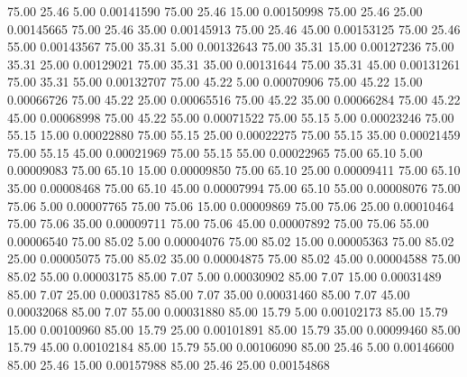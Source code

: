      75.00     25.46      5.00     0.00141590
     75.00     25.46     15.00     0.00150998
     75.00     25.46     25.00     0.00145665
     75.00     25.46     35.00     0.00145913
     75.00     25.46     45.00     0.00153125
     75.00     25.46     55.00     0.00143567
     75.00     35.31      5.00     0.00132643
     75.00     35.31     15.00     0.00127236
     75.00     35.31     25.00     0.00129021
     75.00     35.31     35.00     0.00131644
     75.00     35.31     45.00     0.00131261
     75.00     35.31     55.00     0.00132707
     75.00     45.22      5.00     0.00070906
     75.00     45.22     15.00     0.00066726
     75.00     45.22     25.00     0.00065516
     75.00     45.22     35.00     0.00066284
     75.00     45.22     45.00     0.00068998
     75.00     45.22     55.00     0.00071522
     75.00     55.15      5.00     0.00023246
     75.00     55.15     15.00     0.00022880
     75.00     55.15     25.00     0.00022275
     75.00     55.15     35.00     0.00021459
     75.00     55.15     45.00     0.00021969
     75.00     55.15     55.00     0.00022965
     75.00     65.10      5.00     0.00009083
     75.00     65.10     15.00     0.00009850
     75.00     65.10     25.00     0.00009411
     75.00     65.10     35.00     0.00008468
     75.00     65.10     45.00     0.00007994
     75.00     65.10     55.00     0.00008076
     75.00     75.06      5.00     0.00007765
     75.00     75.06     15.00     0.00009869
     75.00     75.06     25.00     0.00010464
     75.00     75.06     35.00     0.00009711
     75.00     75.06     45.00     0.00007892
     75.00     75.06     55.00     0.00006540
     75.00     85.02      5.00     0.00004076
     75.00     85.02     15.00     0.00005363
     75.00     85.02     25.00     0.00005075
     75.00     85.02     35.00     0.00004875
     75.00     85.02     45.00     0.00004588
     75.00     85.02     55.00     0.00003175
     85.00      7.07      5.00     0.00030902
     85.00      7.07     15.00     0.00031489
     85.00      7.07     25.00     0.00031785
     85.00      7.07     35.00     0.00031460
     85.00      7.07     45.00     0.00032068
     85.00      7.07     55.00     0.00031880
     85.00     15.79      5.00     0.00102173
     85.00     15.79     15.00     0.00100960
     85.00     15.79     25.00     0.00101891
     85.00     15.79     35.00     0.00099460
     85.00     15.79     45.00     0.00102184
     85.00     15.79     55.00     0.00106090
     85.00     25.46      5.00     0.00146600
     85.00     25.46     15.00     0.00157988
     85.00     25.46     25.00     0.00154868
